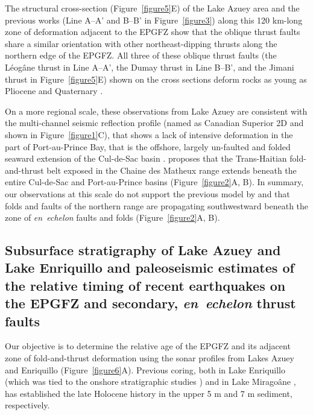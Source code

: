 \documentclass[linenumbers,draft]{agujournal}
\begin{document}
The structural cross-section (Figure~\ref{figure5}E) of the Lake Azuey area and the previous works \citep{massoni1955haiti,bourgueil1988synthese,cox2011shear,douilly2015three} (Line A--A' and B--B' in Figure~\ref{figure3}) along this 120 km-long zone of deformation adjacent to the EPGFZ show that the oblique thrust faults share a similar orientation with other northeast-dipping thrusts along the northern edge of the EPGFZ. All three of these oblique thrust faults (the L\'eog\^ane thrust in Line A--A', the Dumay thrust in Line B--B', and the Jimani thrust in Figure~\ref{figure5}E) shown on the cross sections deform rocks as young as Pliocene and Quaternary \citep{saint2015seismotectonics}. 

On a more regional scale, these observations from Lake Azuey are consistent with the multi-channel seismic reflection profile (named as Canadian Superior 2D and shown in Figure~\ref{figure1}C), that shows a lack of intensive deformation in the part of Port-au-Prince Bay, that is the offshore, largely un-faulted and folded seaward extension of the Cul-de-Sac basin \citep{mchugh2011offshore}. \citet{pubellier2000plate} proposes that the Trans-Haitian fold-and-thrust belt exposed in the Chaine des Matheux range extends beneath the entire Cul-de-Sac and Port-au-Prince basins (Figure~\ref{figure2}A, B). In summary, our observations at this scale do not support the previous model by \citet{pubellier2000plate} and \citet{calais2010transpressional} that folds and faults of the northern range are propagating southwestward beneath the zone of \textit{en~echelon} faults and folds (Figure~\ref{figure2}A, B).

\subsection{Subsurface stratigraphy of Lake Azuey and Lake Enriquillo and paleoseismic estimates of the relative timing of recent earthquakes on the EPGFZ and secondary, \textit{en~echelon} thrust faults}
Our objective is to determine the relative age of the EPGFZ and its adjacent zone of fold-and-thrust deformation using the sonar profiles from Lakes Azuey and Enriquillo (Figure~\ref{figure6}A). Previous coring, both in Lake Enriquillo \citep{rios2013holocene} (which was tied to the onshore stratigraphic studies \citep{taylor1985stratigraphy,rios2013holocene}) and in Lake Mirago\^ane \citep{higuera199910}, has established the late Holocene history in the upper 5 m and 7 m sediment, respectively.
\end{document}
